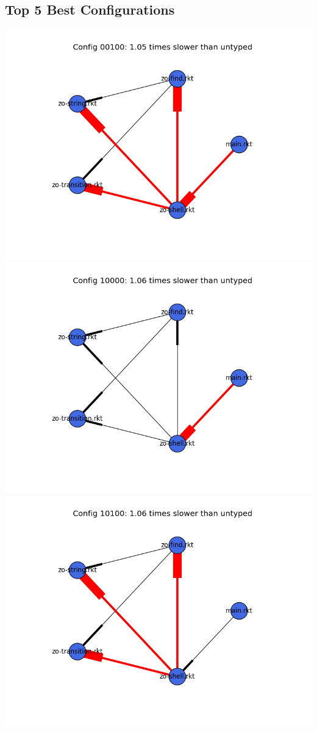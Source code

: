 \documentclass{article}
\begin{document}
\begin{itemize}
\subsection{Top 5 Best Configurations}
\includegraphics[width=\textwidth]{zordoz-2015-04-09-module-graph-00100.png}
\includegraphics[width=\textwidth]{zordoz-2015-04-09-module-graph-10000.png}
\includegraphics[width=\textwidth]{zordoz-2015-04-09-module-graph-10100.png}

\end{itemize}
\end{document}
